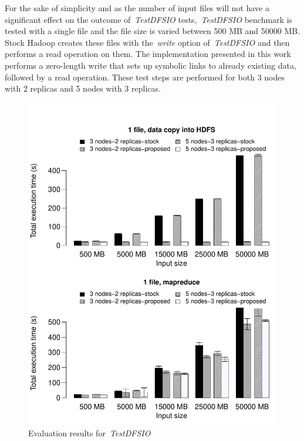 For the sake of simplicity and as the number of input files will not have a significant effect
on the outcome of~\textit{TestDFSIO} tests,~\textit{TestDFSIO} benchmark is tested with a single
file and the file size is varied between 500 MB and 50000 MB. Stock Hadoop creates these files with
the~\textit{write} option of~\textit{TestDFSIO} and then performs a read operation on them. The
implementation presented in this work performs a zero-length write that sets up symbolic links to
already existing data, followed by a read operation. These test steps are performed for both
3 nodes with 2 replicas and 5 nodes with 3 replicas.

\begin{figure}[!htbp]
\centering
\includegraphics[width=\columnwidth, keepaspectratio]{result3.pdf}
\caption{Evaluation results for~\textit{TestDFSIO}}
\label{testdfsiores}
\end{figure}

